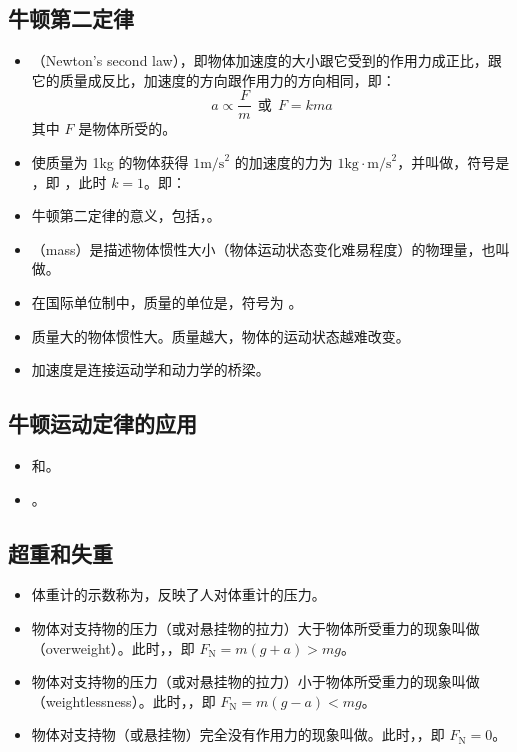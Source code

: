 \subsection{牛顿第二定律}
\begin{itemize}
\item {}（Newton's second law），即物体加速度的大小跟它受到的作用力成正比，跟它的质量成反比，加速度的方向跟作用力的方向相同，即：
$$a\propto\frac Fm~~或~~F=kma$$
其中 $F$ 是物体所受的。
\item {}使质量为 1kg 的物体获得 $\text{1m/s}^2$ 的加速度的力为 $\text{1kg}\cdot\text{m/s}^2$，并叫做，符号是 ，即 ，此时 $k=1$。即：
\item 牛顿第二定律的意义，包括，。
\item {}（mass）是描述物体惯性大小（物体运动状态变化难易程度）的物理量，也叫做。
\item 在国际单位制中，质量的单位是，符号为 。
\item 质量大的物体惯性大。质量越大，物体的运动状态越难改变。
\item 加速度是连接运动学和动力学的桥梁。
\end{itemize}

\subsection{牛顿运动定律的应用}
\begin{itemize}
\item {}和。
\item {}。
\end{itemize}

\subsection{超重和失重}
\begin{itemize}
\item 体重计的示数称为，反映了人对体重计的压力。
\item 物体对支持物的压力（或对悬挂物的拉力）大于物体所受重力的现象叫做（overweight）。此时，，即 $F_{\text{N}}=m(g+a)>mg$。
\item 物体对支持物的压力（或对悬挂物的拉力）小于物体所受重力的现象叫做（weightlessness）。此时，，即 $F_{\text{N}}=m(g-a)<mg$。
\item 物体对支持物（或悬挂物）完全没有作用力的现象叫做。此时，，即 $F_{\text{N}}=0$。
\end{itemize}


